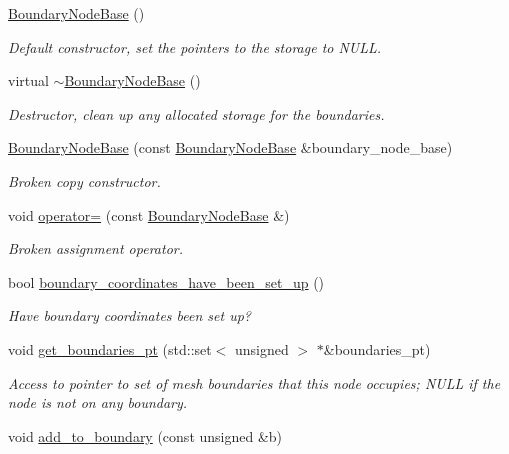 \begin{DoxyCompactItemize}
\hyperlink{classoomph_1_1BoundaryNodeBase_a00957868c82b2ec9f676ebdd80f2edf4}{Boundary\+Node\+Base} ()
\begin{DoxyCompactList}\small\item\em Default constructor, set the pointers to the storage to N\+U\+LL. \end{DoxyCompactList}\item 
virtual \hyperlink{classoomph_1_1BoundaryNodeBase_acb698db0bafda5e858856d4106614059}{$\sim$\+Boundary\+Node\+Base} ()
\begin{DoxyCompactList}\small\item\em Destructor, clean up any allocated storage for the boundaries. \end{DoxyCompactList}\item 
\hyperlink{classoomph_1_1BoundaryNodeBase_ab74b97befa6f30698c3c3a1afd126711}{Boundary\+Node\+Base} (const \hyperlink{classoomph_1_1BoundaryNodeBase}{Boundary\+Node\+Base} \&boundary\+\_\+node\+\_\+base)
\begin{DoxyCompactList}\small\item\em Broken copy constructor. \end{DoxyCompactList}\item 
void \hyperlink{classoomph_1_1BoundaryNodeBase_adec5285d32c00d56dd958ceabe26348a}{operator=} (const \hyperlink{classoomph_1_1BoundaryNodeBase}{Boundary\+Node\+Base} \&)
\begin{DoxyCompactList}\small\item\em Broken assignment operator. \end{DoxyCompactList}\item 
bool \hyperlink{classoomph_1_1BoundaryNodeBase_a5f40147dddc319bcde0e26239e2fb813}{boundary\+\_\+coordinates\+\_\+have\+\_\+been\+\_\+set\+\_\+up} ()
\begin{DoxyCompactList}\small\item\em Have boundary coordinates been set up? \end{DoxyCompactList}\item 
void \hyperlink{classoomph_1_1BoundaryNodeBase_a29342ee40e695be4300b09920456073c}{get\+\_\+boundaries\+\_\+pt} (std\+::set$<$ unsigned $>$ $\ast$\&boundaries\+\_\+pt)
\begin{DoxyCompactList}\small\item\em Access to pointer to set of mesh boundaries that this node occupies; N\+U\+LL if the node is not on any boundary. \end{DoxyCompactList}\item 
void \hyperlink{classoomph_1_1BoundaryNodeBase_a3f909fc5f583bcfa5838766769448343}{add\+\_\+to\+\_\+boundary} (const unsigned \&b)

\end{DoxyCompactItemize}
